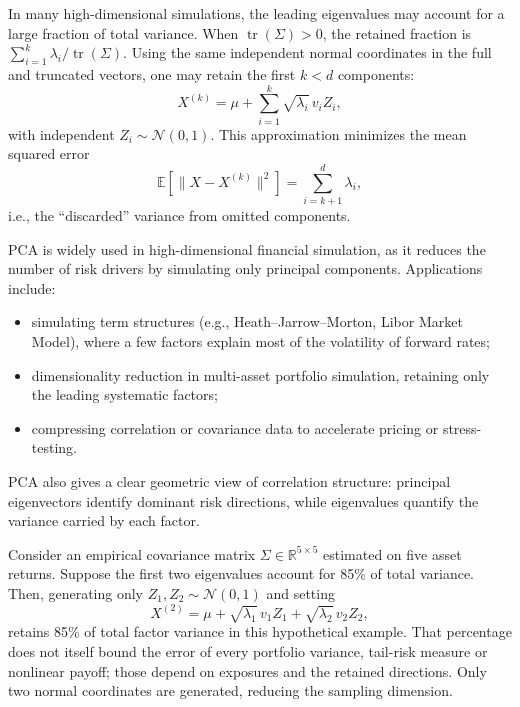 \begin{remark}
In many high-dimensional simulations, 
the leading eigenvalues may account for a large fraction of total
variance. When $\operatorname{tr}(\Sigma)>0$, the retained fraction is
$\sum_{i=1}^k\lambda_i/\operatorname{tr}(\Sigma)$. Using the same
independent normal coordinates in the full and truncated vectors,
one may retain the first $k<d$ components:
\[
X^{(k)} = \mu + \sum_{i=1}^{k} \sqrt{\lambda_i}\, v_i Z_i,
\]
with independent \(Z_i \sim \mathcal{N}(0,1)\).
This approximation minimizes the mean squared error
\[
\mathbb{E}\!\left[\|X - X^{(k)}\|^2\right] = \sum_{i=k+1}^{d} \lambda_i,
\]
i.e., the “discarded” variance from omitted components.
\end{remark}

\begin{remark}
PCA is widely used in high-dimensional financial simulation, 
as it reduces the number of risk drivers by simulating only principal components.
Applications include:
\begin{itemize}
    \item simulating term structures (e.g., Heath--Jarrow--Morton, Libor Market Model), 
          where a few factors explain most of the volatility of forward rates;
    \item dimensionality reduction in multi-asset portfolio simulation, 
          retaining only the leading systematic factors;
    \item compressing correlation or covariance data to accelerate pricing or stress-testing.
\end{itemize}
PCA also gives a clear geometric view of correlation structure: 
principal eigenvectors identify dominant risk directions, 
while eigenvalues quantify the variance carried by each factor.
\end{remark}

\begin{example}
Consider an empirical covariance matrix \(\Sigma \in \mathbb{R}^{5 \times 5}\) estimated on five asset returns.
Suppose the first two eigenvalues account for 85\% of total variance.
Then, generating only \(Z_1, Z_2 \sim \mathcal{N}(0,1)\) and setting
\[
X^{(2)} = \mu + \sqrt{\lambda_1}\, v_1 Z_1 + \sqrt{\lambda_2}\, v_2 Z_2,
\]
retains 85\% of total factor variance in this hypothetical example.
That percentage does not itself bound the error of every portfolio
variance, tail-risk measure or nonlinear payoff; those depend on
exposures and the retained directions.
Only two normal coordinates are generated, reducing the sampling dimension.
\end{example}

